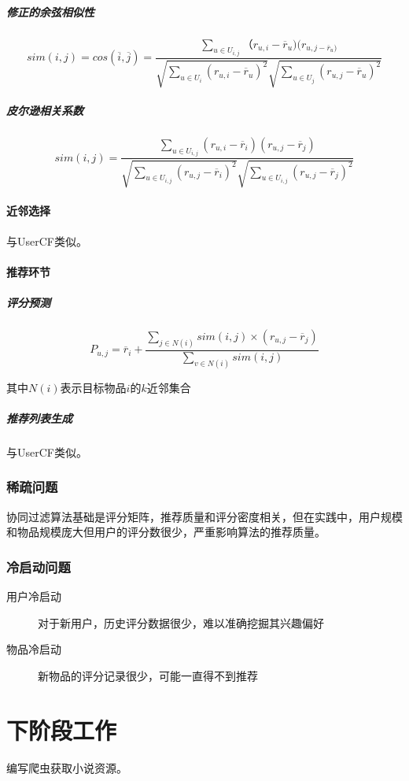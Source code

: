 \documentclass{upctrans}
\begin{document}
\subparagraph{修正的余弦相似性}

\begin{equation*}
    sim(i,j)
    =cos(\overline{i},\overline{j})
    =\frac{\sum\limits_{u\in{U_{i,j}}}
    （r_{u,i}-\overline{r}_u)(r_{u,j-\overline{r}_u)}
    }{\sqrt{\sum\limits_{u\in{U_i}}(r_{u,i}-\overline{r}_u)^2}\sqrt{\sum\limits_{u\in{U_j}}(r_{u,j}-\overline{r}_u)^2}}
\end{equation*}

\subparagraph{皮尔逊相关系数}

\begin{equation*}
    sim(i,j)=\frac{
        \sum\limits_{u\in{U_{i,j}}}
        (r_{u,i}-\overline{r}_i)
        (r_{u,j}-\overline{r}_j)
    }{
        \sqrt{
            \sum\limits_{u\in{U_{i,j}}}(r_{u,j}-\overline{r}_i)^2
        }
        \sqrt{
            \sum\limits_{u\in{U_{i,j}}}(r_{u,j}-\overline{r}_j)^2
        }
    }
\end{equation*}

\paragraph{近邻选择}

与UserCF类似。

\paragraph{推荐环节}
\subparagraph{评分预测}

\begin{equation*}
    P_{u,j}=\overline{r}_i+
    \frac{
        \sum\limits_{j\in{N(i)}}
        sim(i,j)\times (r_{u,j}-\overline{r}_j)
    }{
        \sum\limits_{v\in{N(i)}}
        sim(i,j)
    }
\end{equation*}

其中$N(i)$表示目标物品$i$的$k$近邻集合

\subparagraph{推荐列表生成}

与UserCF类似。

\subsubsection{稀疏问题}

协同过滤算法基础是评分矩阵，推荐质量和评分密度相关，但在实践中，用户规模和物品规模庞大但用户的评分数很少，严重影响算法的推荐质量。

\subsubsection{冷启动问题}

\begin{description}
    \item[用户冷启动] 对于新用户，历史评分数据很少，难以准确挖掘其兴趣偏好
    \item[物品冷启动] 新物品的评分记录很少，可能一直得不到推荐  
\end{description}

\section{下阶段工作}

编写爬虫获取小说资源。

    
\end{document}
